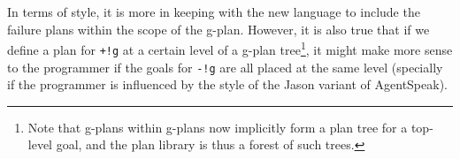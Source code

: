 \noindent In terms of style, it is more in keeping with the new
language to include the failure plans within the scope of the
g-plan. However, it is also true that if we define a plan for
\texttt{+!g} at a certain level of a g-plan tree\footnote{Note that
  g-plans within g-plans now implicitly form a plan tree for a
  top-level goal, and the plan library is thus a forest of such
  trees.}, it might make more sense to the programmer if the goals for
\texttt{-!g} are all placed at the same level (specially if the
programmer is influenced by the style of the Jason variant of
AgentSpeak).

%



%
%
